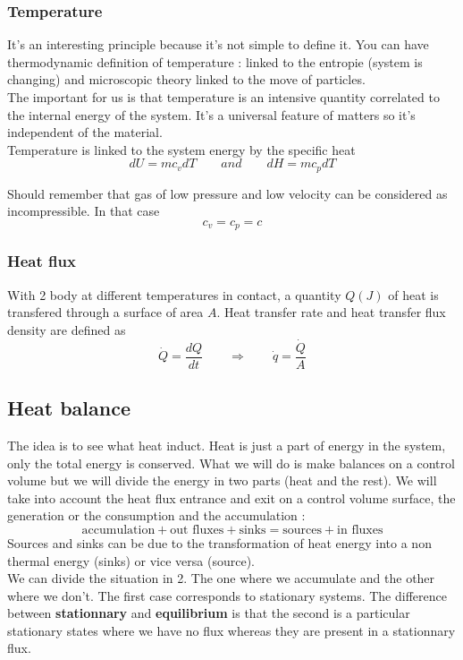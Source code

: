 	\subsubsection{Temperature}
		It's an interesting principle because it’s not simple to define it. You can have thermodynamic definition of temperature : linked to the entropie (system is changing) and microscopic theory linked to the move of particles. \\
		The important for us is that temperature is an intensive quantity correlated to the internal energy of the system. It’s a universal feature of matters so it’s independent of the material. \\
		Temperature is linked to the system energy by the specific heat 
		\begin{equation}
			dU = mc_v dT \qquad and \qquad dH = mc_p dT
		\end{equation}

		Should remember that gas of low pressure and low velocity can be considered as incompressible. In that case 
		\begin{equation}
			c_v = c_p = c
		\end{equation}		 
		
	\subsubsection{Heat flux}
		With 2 body at different temperatures in contact, a quantity $Q(J)$ of heat is transfered through a surface of area $A$. Heat transfer rate and heat transfer flux density are defined as 
		\begin{equation}
			\dot{Q} = \frac{dQ}{dt} \qquad \Rightarrow \qquad \dot{q} = \frac{\dot{Q}}{A}
		\end{equation}
		
\subsection{Heat balance}
		The idea is to see what heat induct. Heat is just a part of energy in the system, only the total energy is conserved. What we will do is make balances on a control volume but we will divide the energy in two parts (heat and the rest). We will take into account the heat flux entrance and exit on a control volume surface, the generation or the consumption and the accumulation :
		\begin{equation}
			\mbox{accumulation} + \mbox{out fluxes} + \mbox{sinks} = \mbox{sources} + \mbox{in fluxes}
			\label{eq:3.4}
		\end{equation}
		Sources and sinks can be due to the transformation of heat energy into a non thermal energy (sinks) or vice versa (source). \\
		We can divide the situation in 2. The one where we accumulate and the other where we don’t. The first case corresponds to stationary systems. The difference between \textbf{stationnary }and \textbf{equilibrium} is that the second is a particular stationary states where we have no flux whereas they are present in a stationnary flux. 

